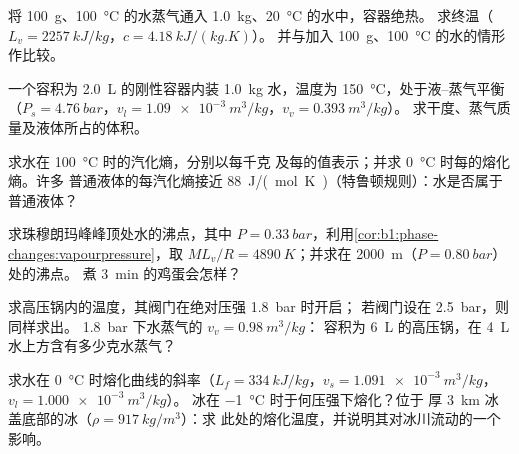 \begin{exercise}[$\star$]\label{exo:b1:phase-changes:2}
将 \qty{100}{g}、\qty{100}{\degreeCelsius} 的水蒸气通入
\qty{1.0}{kg}、\qty{20}{\degreeCelsius} 的水中，容器绝热。
求终温（$L_v = \qty{2257}{kJ/kg}$，$c = \qty{4.18}{kJ/(kg.K)}$）。
并与加入 \qty{100}{g}、\qty{100}{\degreeCelsius} 的水的情形作比较。
\end{exercise}

\begin{exercise}[$\star$]\label{exo:b1:phase-changes:3}
一个容积为 \qty{2.0}{L} 的刚性容器内装 \qty{1.0}{kg} 水，温度为
\qty{150}{\degreeCelsius}，处于液–蒸气平衡（$P_s =
\qty{4.76}{bar}$，$v_l = \qty{1.09e-3}{m^3/kg}$，$v_v = \qty{0.393}{m^3/kg}$）。
求干度、蒸气质量及液体所占的体积。
\end{exercise}

\begin{exercise}[$\star$]\label{exo:b1:phase-changes:4}
求水在 \qty{100}{\degreeCelsius} 时的汽化熵，分别以每千克
及每的值表示；并求 \qty{0}{\degreeCelsius} 时每的熔化熵。许多
普通液体的每汽化熵接近
\qty{88}{J/(mol.K)}（特鲁顿规则）：水是否属于普通液体？
\end{exercise}

\begin{exercise}[$\star\star$]\label{exo:b1:phase-changes:5}
求珠穆朗玛峰峰顶处水的沸点，其中 $P =
\qty{0.33}{bar}$，利用\cref{cor:b1:phase-changes:vapourpressure}，取
$ML_v/R = \qty{4890}{K}$；并求在 \qty{2000}{m}（$P = \qty{0.80}{bar}$）处的沸点。
煮 \qty{3}{min} 的鸡蛋会怎样？
\end{exercise}

\begin{exercise}[$\star\star$]\label{exo:b1:phase-changes:6}
求高压锅内的温度，其阀门在绝对压强 \qty{1.8}{bar} 时开启；
若阀门设在 \qty{2.5}{bar}，则同样求出。
\qty{1.8}{bar} 下水蒸气的 $v_v = \qty{0.98}{m^3/kg}$：
容积为 \qty{6}{L} 的高压锅，在 \qty{4}{L} 水上方含有多少克水蒸气？
\end{exercise}

\begin{exercise}[$\star\star$]\label{exo:b1:phase-changes:7}
求水在 \qty{0}{\degreeCelsius} 时熔化曲线的斜率（$L_f =
\qty{334}{kJ/kg}$，$v_s = \qty{1.091e-3}{m^3/kg}$，$v_l = \qty{1.000e-3}{m^3/kg}$）。
冰在 \qty{-1}{\degreeCelsius} 时于何压强下熔化？位于
厚 \qty{3}{km} 冰盖底部的冰（$\rho = \qty{917}{kg/m^3}$）：求
此处的熔化温度，并说明其对冰川流动的一个影响。
\end{exercise}

